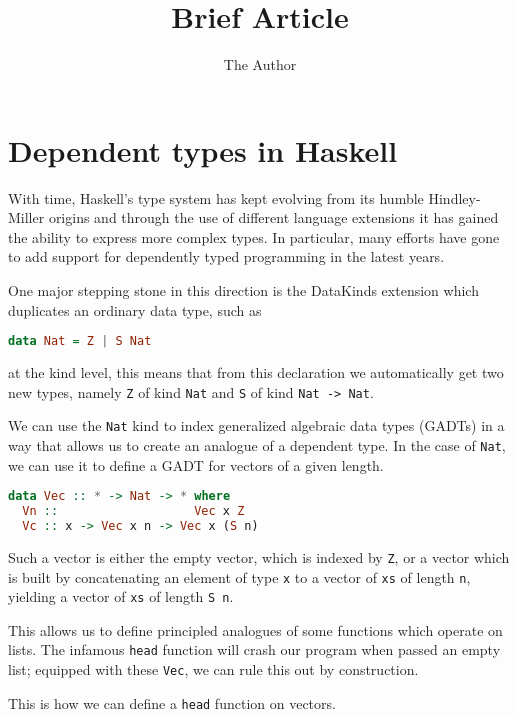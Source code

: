 \documentclass[11pt]{article}
\title{Brief Article}
\author{The Author}
\date{}
\begin{document}
\maketitle


\section{Dependent types in
Haskell}\label{dependent-types-in-haskell}

With time, Haskell's type system has kept evolving from its humble
Hindley-Miller origins and through the use of different language extensions it has gained the ability 
to express more complex types. In particular, many efforts have gone to add support for dependently
typed programming in the latest years.

One major stepping stone in this direction is the DataKinds extension which duplicates an ordinary data type, such as

\begin{lstlisting}[language=haskell]
data Nat = Z | S Nat
\end{lstlisting}

at the kind level, this means that from this declaration we automatically get two new types, namely \texttt{Z} of kind \texttt{Nat}
and \texttt{S} of kind \texttt{Nat\ -\textgreater{}\ Nat}.

We can use the \texttt{Nat} kind to index generalized algebraic data
types (GADTs) in a way that allows us to create an analogue of a
dependent type. In the case of \texttt{Nat}, we can use it to define a
GADT for vectors of a given length.

\begin{lstlisting}[language=haskell]
data Vec :: * -> Nat -> * where
  Vn ::                   Vec x Z
  Vc :: x -> Vec x n -> Vec x (S n)
\end{lstlisting}

Such a vector is either the empty vector, which is indexed by
\texttt{Z}, or a vector which is built by concatenating an element of
type \texttt{x} to a vector of \texttt{xs} of length \texttt{n},
yielding a vector of \texttt{xs} of length \texttt{S\ n}.

This allows us to define principled analogues of some functions which
operate on lists. The infamous \texttt{head} function will
crash our program when passed an empty list; equipped with these \texttt{Vec}, we can rule this
out by construction. 

This is how we can define a \texttt{head} function on vectors.
\end{document}
